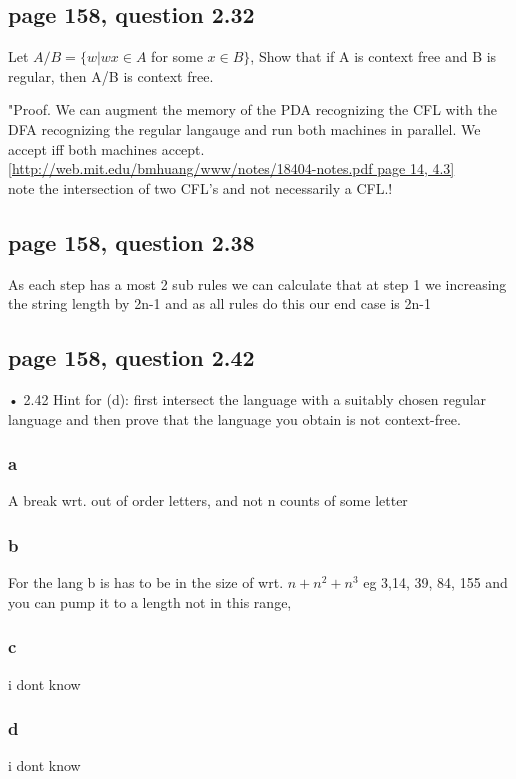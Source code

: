 \documentclass[a4paper,10pt,titlepage]{report}
\begin{document}
\subsection{page 158, question 2.32}
 Let $A/B=\{w|wx \in A$ for some $x \in B \}$, Show that if A is context free and B is regular, then A/B is context free.
 
 "Proof. We can augment the memory of the PDA recognizing the CFL with the DFA recognizing the regular langauge and run both machines in parallel. We accept iff both machines accept.\ref{http://web.mit.edu/bmhuang/www/notes/18404-notes.pdf page 14, 4.3}\\
 note the intersection of two CFL's and not necessarily a CFL.!
 
 
 \subsection{page 158, question 2.38}
 As each step has a most 2 sub rules we can calculate that at step 1 we increasing the string length by 2n-1 and as all rules do this our end case is 2n-1
 
 \subsection{page 158, question 2.42}
 • 2.42 Hint for (d): first intersect the language with a suitably chosen regular language
and then prove that the language you obtain is not context-free.

 \begin{multicols}{2}
\subsubsection{a}
A break wrt. out of order letters, and not n counts of some letter
\subsubsection{b}
For the lang b is has to be in the size of wrt. $n+n^2+n^3$ eg 3,14, 39, 84, 155 and you can pump it to a length not in this range,

\subsubsection{c}
i dont know
\subsubsection{d}
i dont know

\end{multicols}
\newpage
\end{document}
